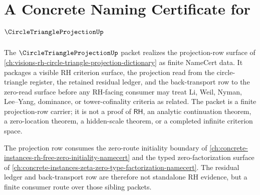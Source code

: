 \chapter{A Concrete Naming Certificate for $\CircleTriangleProjectionUp$}
\label{ch:concrete-instances-circle-triangle-projection-namecert}

The $\CircleTriangleProjectionUp$ packet realizes the projection-row surface of \autoref{ch:visions-rh-circle-triangle-projection-dictionary} as finite NameCert data. It packages a visible RH criterion surface, the projection read from the circle-triangle register, the retained residual ledger, and the back-transport row to the zero-read surface before any RH-facing consumer may treat Li, Weil, Nyman, Lee--Yang, dominance, or tower-cofinality criteria as related. The packet is a finite projection-row carrier; it is not a proof of $\mathsf{RH}$, an analytic continuation theorem, a zero-location theorem, a hidden-scale theorem, or a completed infinite criterion space.

The projection row consumes the zero-route initiality boundary of \autoref{ch:concrete-instances-rh-free-zero-initiality-namecert} and the typed zero-factorization surface of \autoref{ch:concrete-instances-zeta-zero-type-factorization-namecert}. The residual ledger and back-transport row are therefore not standalone RH evidence, but a finite consumer route over those sibling packets.

